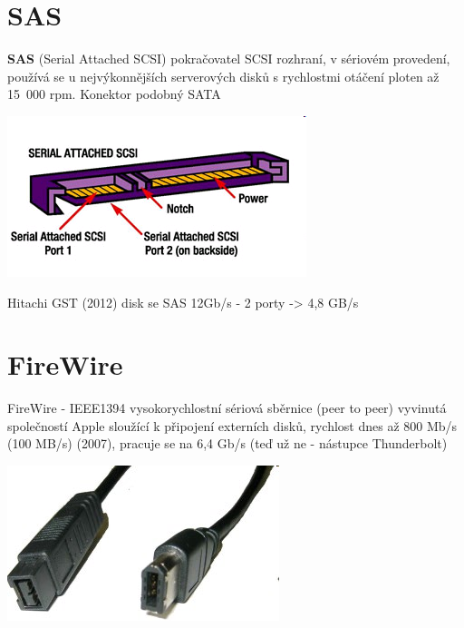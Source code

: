 \documentclass[aspectratio=43]{beamer}
\begin{document}
\section{SAS}
\begin{frame}{\textbf{SAS} (Serial Attached SCSI)}
	pokračovatel SCSI rozhraní,  v sériovém provedení, 
	používá se u nejvýkonnějších serverových disků s 
	rychlostmi otáčení ploten až 15~000 rpm. Konektor 
	podobný SATA
	\begin{center}
		\includegraphics[width=0.8\linewidth]{extrahovane_obrazky/img_2_page37_0.png}
	\end{center}
	Hitachi GST (2012) disk se SAS 12Gb/s - 2 porty -> 4,8 GB/s
\end{frame}

\section{FireWire}
\begin{frame}{FireWire - IEEE1394}
	vysokorychlostní sériová sběrnice (peer to peer) vyvinutá společností Apple sloužící k připojení externích disků, rychlost dnes až 800 Mb/s (100 MB/s) (2007), pracuje se na 6,4 Gb/s (teď už ne - nástupce Thunderbolt)
	
	\begin{center}
		\includegraphics[width=0.8\linewidth]{extrahovane_obrazky/img_2_page39_0.jpeg}
	\end{center}
	
\end{frame}
\end{document}
